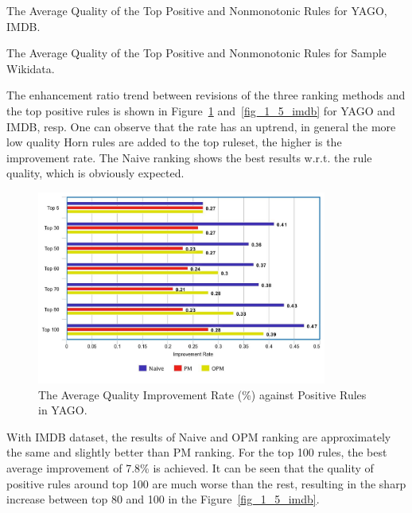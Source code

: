 \begin{table}[ht]
\centering
\footnotesize
\renewcommand*{\arraystretch}{1.07}
\centering

\smallskip
\caption{The Average Quality of the Top Positive and Nonmonotonic Rules for YAGO, IMDB.}
\label{tab:rules_quality1}
\end{table}

\begin{table}[ht]
\centering
\footnotesize
\renewcommand*{\arraystretch}{1.07}
\centering

\smallskip
\caption{The Average Quality of the Top Positive and Nonmonotonic Rules for Sample Wikidata.}
\label{tab:rules_quality2}
\end{table}

The enhancement ratio trend between revisions of the three ranking methods and the top positive rules is shown in Figure~\ref{fig_1_5_yago} and~\ref{fig_1_5_imdb} for YAGO and IMDB, resp. One can observe that the rate has an uptrend, in general the more low quality Horn rules are added to the top ruleset, the higher is the improvement rate. The Naive ranking shows the best results w.r.t. the rule quality, which is obviously expected.

\begin{figure}[ht]
\centering
\includegraphics[width=0.85\textwidth]{figures/table_1_5_yago.jpeg}
\caption{The Average Quality Improvement Rate (\%) against Positive Rules in YAGO.}
\label{fig_1_5_yago}
\end{figure}

With IMDB dataset, the results of Naive and OPM ranking are approximately the same and slightly better than PM ranking. For the top 100 rules, the best average improvement of 7.8\% is achieved. It can be seen that the quality of positive rules around top 100 are much worse than the rest, resulting in the sharp increase between top 80 and 100 in the Figure~\ref{fig_1_5_imdb}.

